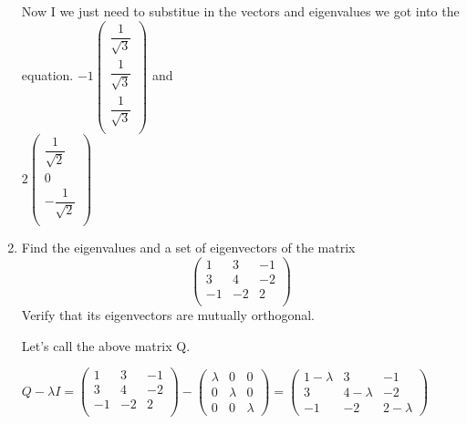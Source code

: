 \documentclass[fleqn]{article}
\begin{document}
\begin{enumerate}
      \textcolor{hwColor}{
        Now I we just need to substitue in the vectors and eigenvalues we got into the equation.
        $
        -1\begin{pmatrix}
          \dfrac{1}{\sqrt{3}} \\
          \dfrac{1}{\sqrt{3}} \\
          \dfrac{1}{\sqrt{3}} \\
        \end{pmatrix}
        $  and \\
        $
          2\begin{pmatrix}
            \dfrac{1}{\sqrt{2}} \\
            0 \\
            -\dfrac{1}{\sqrt{2}} \\
          \end{pmatrix}
        $
      }
      

    \item Find the eigenvalues and a set of eigenvectors of the matrix
      $$ 
      \begin{pmatrix}
        1 & 3 & -1 \\
        3 & 4 & -2 \\
        -1 & -2 & 2 \\
      \end{pmatrix}
      $$
      Verify that its eigenvectors are mutually orthogonal.

      \textcolor{hwColor}{
        Let's call the above matrix Q.
      }

      \textcolor{hwColor}{
        $
          Q-\lambda I= \begin{pmatrix}
            1 & 3 & -1 \\
            3 & 4 & -2 \\
            -1 & -2 & 2 \\
          \end{pmatrix}-\begin{pmatrix}
            \lambda & 0 & 0 \\
            0 & \lambda & 0 \\
            0 & 0 & \lambda
          \end{pmatrix}=\begin{pmatrix}
            1-\lambda & 3 & -1 \\
            3 & 4-\lambda & -2 \\
            -1 & -2 & 2-\lambda
          \end{pmatrix}
        $
      }


\end{enumerate}
\end{document}
